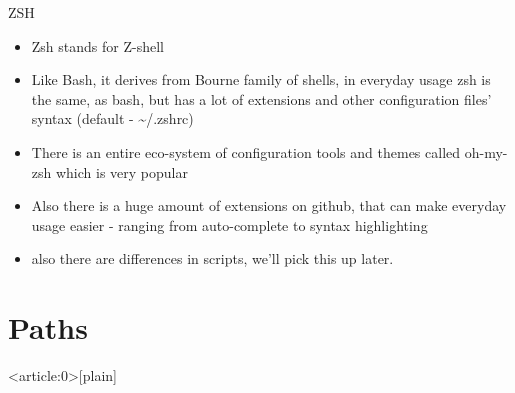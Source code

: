 \documentclass[usenames,dvipsnames,10pt,aspectratio=169]{beamer}
\begin{document}
\begin{frame}{ZSH}
    \begin{itemize}
        \item Zsh stands for {\color{ucugreen}Z-shell}
        \item Like Bash, it derives from Bourne family of shells, in everyday usage zsh is the same, as {\color{ucugreen} bash}, but has a lot of extensions and other configuration files' syntax (default - {\color{ucugreen} \textasciitilde/.zshrc})
        \item There is an entire eco-system of configuration tools and themes called oh-my-zsh which is very popular
        \item Also there is a huge amount of extensions on github, that can make everyday usage easier - ranging from auto-complete to syntax highlighting
        \item also there are differences in scripts, we'll pick this up later.
        
    \end{itemize}
\end{frame}

\section{Paths}

{ %
    \begin{frame}<article:0>[plain]
     \end{frame}
}
\end{document}
